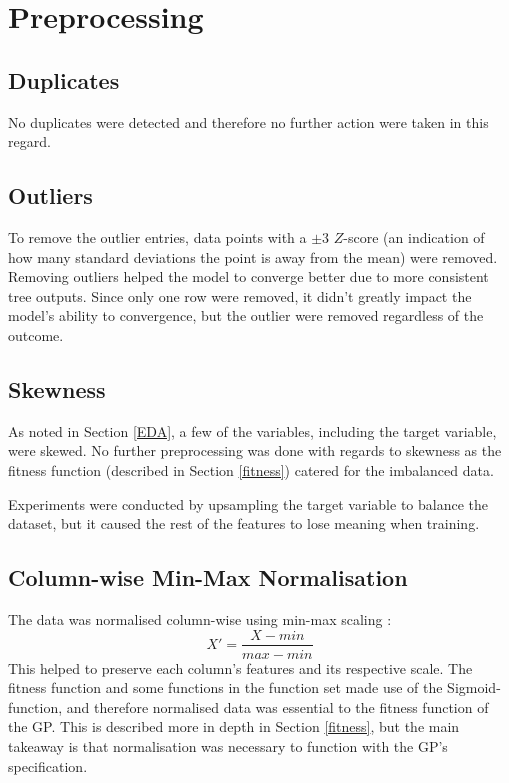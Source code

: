 \documentclass{article}
\begin{document}
\section{Preprocessing}
\label{preprocessing}
\subsection{Duplicates}
No duplicates were detected and therefore no further action were taken in this regard.

\subsection{Outliers}
To remove the outlier entries, data points with a \(\pm{3}\) \(Z\)-score (an indication of how many standard deviations the point is away from the mean) were removed. Removing outliers helped the model to converge better due to more consistent tree outputs. Since only one row were removed, it didn't greatly impact the model's ability to convergence, but the outlier were removed regardless of the outcome.

\subsection{Skewness}
As noted in Section \ref{EDA}, a few of the variables, including the target variable, were skewed. No further preprocessing was done with regards to skewness as the fitness function (described in Section \ref{fitness}) catered for the imbalanced data.

Experiments were conducted by upsampling the target variable to balance the dataset, but it caused the rest of the features to lose meaning when training.

\subsection{Column-wise Min-Max Normalisation}
The data was normalised column-wise using min-max scaling \cite{patro_2015_normalization}:
\begin{equation}\label{norm}
  X' = \frac{X-min}{max-min}
\end{equation}
This helped to preserve each column's features and its respective scale. The fitness function and some functions in the function set made use of the Sigmoid-function, and therefore normalised data was essential to the fitness function of the GP. This is described more in depth in Section \ref{fitness}, but the main takeaway is that normalisation was necessary to function with the GP's specification.
\end{document}
